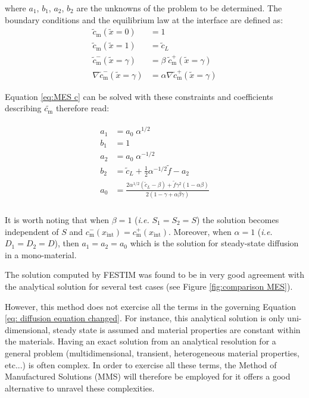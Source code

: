 where $a_1$, $b_1$, $a_2$, $b_2$ are the unknowns of the problem to be determined.
The boundary conditions and the equilibrium law at the interface are defined as:
\begin{subequations} \label{eq: bcs MES}
\begin{align} 
        \tilde{c}_\mathrm{m}(\tilde{x}=0) & = 1 \\
        \tilde{c}_\mathrm{m}(\tilde{x}=1) & =  \tilde{c}_L \\
        \tilde{c}_\mathrm{m}^-(\tilde{x}=\gamma) & =  \beta \; \tilde{c}_\mathrm{m}^+(\tilde{x}=\gamma)\\
        \nabla \tilde{c}_\mathrm{m}^-(\tilde{x}=\gamma) & =  \alpha \nabla \tilde{c}_\mathrm{m}^+(\tilde{x}=\gamma)
\end{align}
\end{subequations}


Equation \ref{eq:MES c} can be solved with these constraints and coefficients describing $\tilde{c_\mathrm{m}}$ therefore read:

\begin{align}
    \begin{split}
        a_1 &= a_0 \; \alpha^{1/2}  \\
        b_1 &= 1 \\
        a_2 &= a_0 \; \alpha^{-1/2}\\
        b_2 &= \tilde{c}_L + \frac{1}{2} \alpha^{-1/2} \tilde{f} - a_2 \\
        a_0 &= \frac{2 \alpha^{1/2}( \tilde{c}_L - \beta) + \tilde{f} \gamma^{2} ( 1 - \alpha \beta)}{2 \left( 1  - \gamma + \alpha \beta \gamma \right)} \\
    \end{split}
    \label{eq: MES c coefficients}
\end{align}

It is worth noting that when $\beta=1$ (\textit{i.e.} $S_1 = S_2 = S$) the solution becomes independent of $S$ and {$c_\mathrm{m}^{-}(x_\mathrm{int}) = c_\mathrm{m}^{+}(x_\mathrm{int})$}.
Moreover, when $\alpha = 1$ (\textit{i.e.} $D_1 = D_2 = D$), then $a_1 = a_2 = a_0$ which is the solution for steady-state diffusion in a mono-material.

The solution computed by FESTIM was found to be in very good agreement with the analytical solution for several test cases (see Figure \ref{fig:comparison MES}).

 
However, this method does not exercise all the terms in the governing Equation \ref{eq: diffusion equation changed}.
For instance, this analytical solution is only uni-dimensional, steady state is assumed and material properties are constant within the materials.
Having an exact solution from an analytical resolution for a general problem (multidimensional, transient, heterogeneous material properties, etc...) is often complex.
In order to exercise all these terms, the Method of Manufactured Solutions (MMS) will therefore be employed for it offers a good alternative to unravel these complexities.

